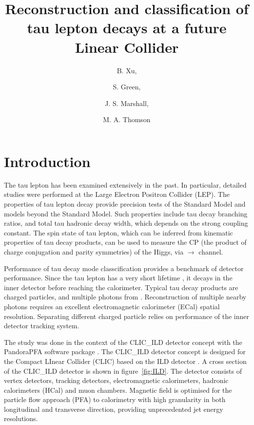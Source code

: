 \documentclass[a4paper,11pt]{article}
\title{\boldmath Reconstruction and classification of tau lepton decays at a future \Pem \Pep Linear Collider}
\author[a,1]{B. Xu,\note{Corresponding author.}}
\author[a]{S. Green,}
\author[a]{J. S. Marshall,}
\author[a]{M. A. Thomson}
\affiliation[a]{Cavendish Laboratory,\\JJ Thomson Avenue, Cambridge, CB3 0HE, UK}
\newcommand{\higgsToTauTau}{\PHiggs $\to$ \PGtm \PGtp}
\begin{document}
\maketitle
\flushbottom


\section{Introduction}

The tau lepton has been examined extensively in the past. In particular, detailed studies were performed at the Large Electron Positron Collider (LEP)\cite{Schael:2005am}. The properties of tau lepton decay  provide precision tests of the Standard Model and models beyond the Standard Model. Such properties include tau decay branching ratios, and total tau hadronic decay width, which depends on the strong coupling constant. The spin state of tau lepton, which can be inferred from kinematic properties of tau decay products, can be used to measure the CP (the product of charge conjugation and parity symmetries) of the Higgs, via \higgsToTauTau channel. 

Performance of tau decay mode classcification provides a benchmark of detector performance. Since the tau lepton has a very short lifetime \cite{Abreu:1991jn}, it decays in the inner detector before reaching the calorimeter. Typical tau decay products are charged particles, and multiple photons from \PGpz. Reconstruction of multiple nearby photons requires an excellent electromagnetic calorimeter (ECal) spatial resolution. Separating different charged particle relies on performance of the inner detector tracking system. 

The study was done in the context of the CLIC\_ILD detector concept \cite{Linssen:2012hp} with the PandoraPFA software package \cite{Marshall:2015rfa}. The CLIC\_ILD detector concept is designed for the Compact LInear Collider (CLIC) \cite{Linssen:2012hp} based on the ILD detector \cite{Abe:2010aa}. A cross section of the CLIC\_ILD detector is shown in figure~\ref{fig:ILD}. The detector consists of vertex detectors, tracking detectors, electromagnetic calorimeters, hadronic calorimeters (HCal) and muon chambers. Magnetic field is optimised for the particle flow approach (PFA) to calorimetry \cite{Thomson:2009rp} with high granularity in both longitudinal and transverse direction, providing unprecedented jet energy resolutions.
\end{document}
